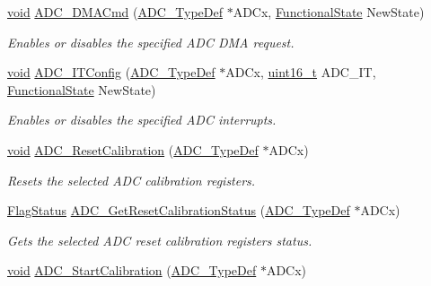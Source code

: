 \begin{DoxyCompactItemize}
\hyperlink{usb__devapi_8h_afabf60e7f57651d6d595a02c75f07cd0}{void} \hyperlink{group___a_d_c___exported___functions_gac5881d5995818001584b27b137a8dbcb}{A\+D\+C\+\_\+\+D\+M\+A\+Cmd} (\hyperlink{struct_a_d_c___type_def}{A\+D\+C\+\_\+\+Type\+Def} $\ast$A\+D\+Cx, \hyperlink{agilefox_2library_2inc_2stm32f10x__type_8h_ac9a7e9a35d2513ec15c3b537aaa4fba1}{Functional\+State} New\+State)
\begin{DoxyCompactList}\small\item\em Enables or disables the specified A\+DC D\+MA request. \end{DoxyCompactList}\item 
\hyperlink{usb__devapi_8h_afabf60e7f57651d6d595a02c75f07cd0}{void} \hyperlink{group___a_d_c___exported___functions_gad4c84b54b539944f555488bf979f82b6}{A\+D\+C\+\_\+\+I\+T\+Config} (\hyperlink{struct_a_d_c___type_def}{A\+D\+C\+\_\+\+Type\+Def} $\ast$A\+D\+Cx, \hyperlink{_p_e___types_8h_a1f1825b69244eb3ad2c7165ddc99c956}{uint16\+\_\+t} A\+D\+C\+\_\+\+IT, \hyperlink{agilefox_2library_2inc_2stm32f10x__type_8h_ac9a7e9a35d2513ec15c3b537aaa4fba1}{Functional\+State} New\+State)
\begin{DoxyCompactList}\small\item\em Enables or disables the specified A\+DC interrupts. \end{DoxyCompactList}\item 
\hyperlink{usb__devapi_8h_afabf60e7f57651d6d595a02c75f07cd0}{void} \hyperlink{group___a_d_c___exported___functions_ga3d542020ba28c1d16238a0defbee6d8f}{A\+D\+C\+\_\+\+Reset\+Calibration} (\hyperlink{struct_a_d_c___type_def}{A\+D\+C\+\_\+\+Type\+Def} $\ast$A\+D\+Cx)
\begin{DoxyCompactList}\small\item\em Resets the selected A\+DC calibration registers. \end{DoxyCompactList}\item 
\hyperlink{agilefox_2library_2inc_2stm32f10x__type_8h_a89136caac2e14c55151f527ac02daaff}{Flag\+Status} \hyperlink{group___a_d_c___exported___functions_ga113be9fe25add8d7496bed659c68e02b}{A\+D\+C\+\_\+\+Get\+Reset\+Calibration\+Status} (\hyperlink{struct_a_d_c___type_def}{A\+D\+C\+\_\+\+Type\+Def} $\ast$A\+D\+Cx)
\begin{DoxyCompactList}\small\item\em Gets the selected A\+DC reset calibration registers status. \end{DoxyCompactList}\item 
\hyperlink{usb__devapi_8h_afabf60e7f57651d6d595a02c75f07cd0}{void} \hyperlink{group___a_d_c___exported___functions_gadcba6341124a6aabfd2dd885ca8e5f14}{A\+D\+C\+\_\+\+Start\+Calibration} (\hyperlink{struct_a_d_c___type_def}{A\+D\+C\+\_\+\+Type\+Def} $\ast$A\+D\+Cx)

\end{DoxyCompactItemize}
